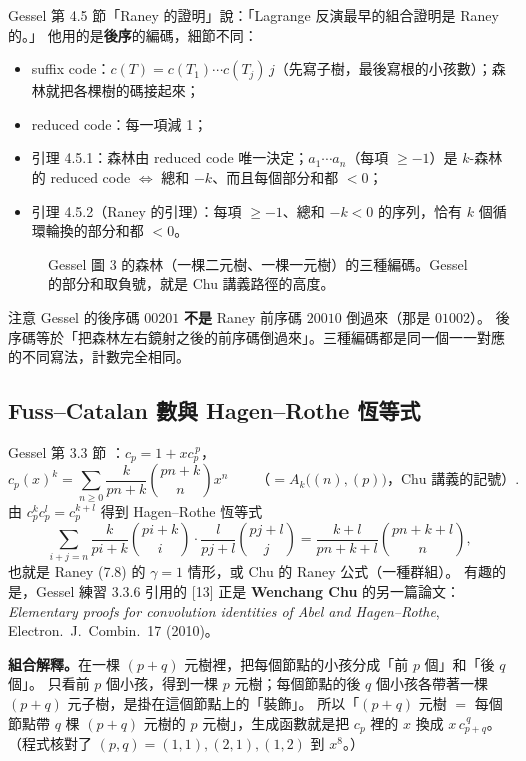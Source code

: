 Gessel 第 4.5 節「Raney 的證明」說：「Lagrange 反演最早的組合證明是 Raney 的。」
他用的是\textbf{後序}的編碼，細節不同：
\begin{itemize}
  \item suffix code：$c(T)=c(T_1)\cdots c(T_j)\,j$（先寫子樹，最後寫根的小孩數）；森林就把各棵樹的碼接起來；
  \item reduced code：每一項減 1；
  \item 引理 4.5.1：森林由 reduced code 唯一決定；$a_1\cdots a_n$（每項 $\ge-1$）是 $k$-森林的 reduced code
        $\iff$ 總和 $-k$、而且每個部分和都 $<0$；
  \item 引理 4.5.2（Raney 的引理）：每項 $\ge-1$、總和 $-k<0$ 的序列，恰有 $k$ 個循環輪換的部分和都 $<0$。
\end{itemize}

\begin{figure}[H]
\centering
\RanGesselCodes
\caption{Gessel 圖 3 的森林（一棵二元樹、一棵一元樹）的三種編碼。Gessel 的部分和取負號，就是 Chu 講義路徑的高度。}
\label{fig:gessel}
\end{figure}

注意 Gessel 的後序碼 $00201$ \textbf{不是} Raney 前序碼 $20010$ 倒過來（那是 $01002$）。
後序碼等於「把森林左右鏡射之後的前序碼倒過來」。三種編碼都是同一個一一對應的不同寫法，計數完全相同。

\subsection{Fuss--Catalan 數與 Hagen--Rothe 恆等式}

Gessel 第 3.3 節 ：$c_p=1+xc_p^{\,p}$，
\[
c_p(x)^k=\sum_{n\ge0}\frac{k}{pn+k}\binom{pn+k}{n}x^n\qquad\text{（$=A_k\big((n),(p)\big)$，Chu 講義的記號）}.
\]
由 $c_p^kc_p^l=c_p^{k+l}$ 得到 Hagen--Rothe 恆等式
\[
\sum_{i+j=n}\frac{k}{pi+k}\binom{pi+k}{i}\cdot\frac{l}{pj+l}\binom{pj+l}{j}=\frac{k+l}{pn+k+l}\binom{pn+k+l}{n},
\]
也就是 Raney (7.8) 的 $\gamma=1$ 情形，或 Chu 的 Raney 公式（一種群組）。
有趣的是，Gessel 練習 3.3.6 引用的 [13] 正是 \textbf{Wenchang Chu} 的另一篇論文：
\emph{Elementary proofs for convolution identities of Abel and Hagen--Rothe}, Electron.\ J.\ Combin.\ 17 (2010)。

\begin{exbox}[Gessel 練習 3.3.2：$c_{p+q}(x)=c_p\big(x\,c_{p+q}(x)^q\big)$ \extra]
\textbf{組合解釋。}在一棵 $(p+q)$ 元樹裡，把每個節點的小孩分成「前 $p$ 個」和「後 $q$ 個」。
只看前 $p$ 個小孩，得到一棵 $p$ 元樹；每個節點的後 $q$ 個小孩各帶著一棵 $(p+q)$ 元子樹，是掛在這個節點上的「裝飾」。
所以「$(p+q)$ 元樹 $=$ 每個節點帶 $q$ 棵 $(p+q)$ 元樹的 $p$ 元樹」，生成函數就是把 $c_p$ 裡的 $x$ 換成 $x\,c_{p+q}^{\,q}$。
（程式核對了 $(p,q)=(1,1),(2,1),(1,2)$ 到 $x^8$。）
\end{exbox}

